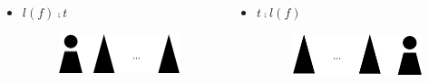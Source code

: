 \documentclass{beamer}
\begin{document}
\begin{frame}
\begin{itemize}
\begin{columns}[c]
\begin{itemize}
\item $l(f) \comp t$
\begin{figure}
	\includegraphics[width=0.8\linewidth]{Forest}
	\label{Forest} 
	\centering
\end{figure}
\end{itemize}
\begin{itemize}
\item $t \comp l(f)$
\begin{figure}
	\includegraphics[width=0.8\linewidth]{Forest2}
	\label{Another Forest Representation} 
	\centering
\end{figure}
\end{itemize}
\end{columns}
\end{itemize}
\end{frame}

\end{document}
